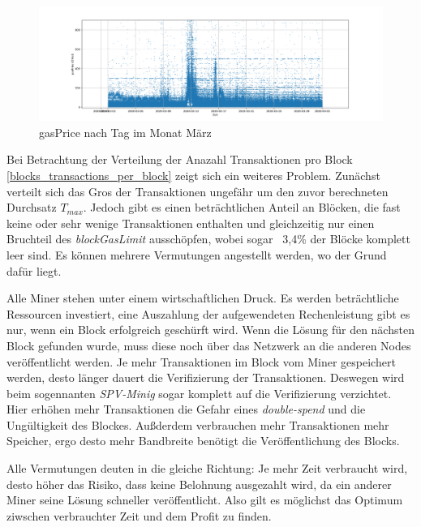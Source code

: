 \documentclass[runningheads]{llncs}
\begin{document}
\begin{figure}[h!]
  \centerline{\includegraphics[width=\textwidth, keepaspectratio]{transactions_gasprice_timeseries.png}}
  \caption{gasPrice nach Tag im Monat März \cite{neemann_appendix_nodate}}
  \label{transactions_gasprice_timeseries}
\end{figure}

Bei Betrachtung der Verteilung der Anazahl Transaktionen pro Block \ref{blocks_transactions_per_block} zeigt sich ein weiteres Problem. Zunächst verteilt sich das Gros der Transaktionen ungefähr um den zuvor berechneten Durchsatz $ T_{max} $. Jedoch gibt es einen beträchtlichen Anteil an Blöcken, die fast keine oder sehr wenige Transaktionen enthalten und gleichzeitig nur einen Bruchteil des \textit{blockGasLimit} ausschöpfen, wobei sogar ~3,4\% der Blöcke komplett leer sind. \cite{neemann_appendix_nodate} Es können mehrere Vermutungen angestellt werden, wo der Grund dafür liegt.

Alle Miner stehen unter einem wirtschaftlichen Druck. Es werden beträchtliche Ressourcen investiert, eine Auszahlung der aufgewendeten Rechenleistung gibt es nur, wenn ein Block erfolgreich geschürft wird. Wenn die Lösung für den nächsten Block gefunden wurde, muss diese noch über das Netzwerk an die anderen Nodes veröffentlicht werden. Je mehr Transaktionen im Block vom Miner gespeichert werden, desto länger dauert die Verifizierung der Transaktionen. Deswegen wird beim sogennanten \textit{SPV-Minig} sogar komplett auf die Verifizierung verzichtet. \cite{svanevik_why_2018} Hier erhöhen mehr Transaktionen die Gefahr eines \textit{double-spend} und die Ungültigkeit des Blockes. Außderdem verbrauchen mehr Transaktionen mehr Speicher, ergo desto mehr Bandbreite benötigt die Veröffentlichung des Blocks. \cite{research_empty_nodate}

Alle Vermutungen deuten in die gleiche Richtung: Je mehr Zeit verbraucht wird, desto höher das Risiko, dass keine Belohnung ausgezahlt wird, da ein anderer Miner seine Lösung schneller veröffentlicht. Also gilt es möglichst das Optimum ziwschen verbrauchter Zeit und dem Profit zu finden.
\end{document}
